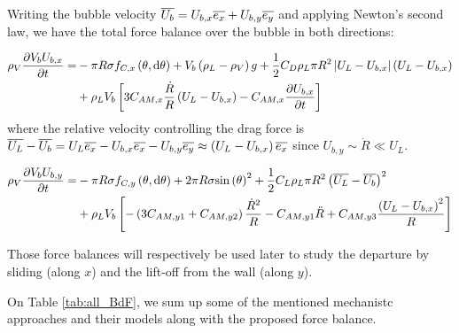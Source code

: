 Writing the bubble velocity $\overline{U_{b}} = U_{b,x}\overline{e_{x}} + U_{b,y}\overline{e_{y}}$ and applying Newton's second law, we have the total force balance over the bubble in both directions:

\begin{align}
\nonumber \rho_{V} \dtime{V_{b}U_{b,x}} = & -\pi R \sigma f_{C,x}\parth{\theta, \dtheta} + V_{b}\parth{\rho_{L}-\rho_{V}}g + \frac{1}{2}C_{D}\rho_{L}\pi R^{2} \bars{U_{L}-U_{b,x}}\parth{U_{L}-U_{b,x}}\\
%
& + \rho_{L}V_{b}\crocht{3C_{AM,x}\frac{\dot{R}}{R}\parth{U_{L}-U_{b,x}} - C_{AM,x} \dtime{U_{b,x}}}
\label{eq:bdf_x}
\end{align}
where the relative velocity controlling the drag force is $\overline{U_{L}} - \overline{U_{b}} = U_{L}\overline{e_{x}} -  U_{b,x}\overline{e_{x}} - U_{b,y}\overline{e_{y}} \approx \left( U_{L}-U_{b,x} \right) \overline{e_{x}}$ since $U_{b,y}\sim \dot{R} \ll U_{L}$.

\begin{align}
\nonumber \rho_{V} \dtime{V_{b}U_{b,y}} = & -\pi R \sigma f_{C,y}\parth{\theta, \dtheta} + 2\pi R \sigma \sin{\theta}^{2} + \frac{1}{2}C_{L}\rho_{L}\pi R^{2} \parth{\vect{U_{L}}-\vect{U_{b}}}^{2}\\
%
& + \rho_{L}V_{b}\crocht{-\parth{3 C_{AM,y1} + C_{AM,y2}}\frac{\dot{R}^{2}}{R}-C_{AM,y1}\ddot{R} + C_{AM,y3}\frac{\parth{U_{L}-U_{b,x}}^{2}}{R}}
\label{eq:bdf_y}
\end{align}

Those force balances will respectively be used later to study the departure by sliding (along $x$) and the lift-off from the wall (along $y$).

\npar

On Table \ref{tab:all_BdF}, we sum up some of the mentioned mechanistc approaches and their models along with the proposed force balance.



